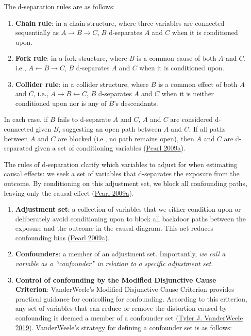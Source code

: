 \documentclass[
  singlecolumn]{article}
\begin{document}
The d-separation rules are as follows:

\begin{enumerate}
\def\labelenumi{\alph{enumi}.}
\item
  \textbf{Chain rule}: in a chain structure, where three variables are
  connected sequentially as \(A \rightarrow B \rightarrow C\), \(B\)
  d-separates \(A\) and \(C\) when it is conditioned upon.
\item
  \textbf{Fork rule}: in a fork structure, where \(B\) is a common cause
  of both \(A\) and \(C\), i.e., \(A \leftarrow B \rightarrow C\), \(B\)
  d-separates \(A\) and \(C\) when it is conditioned upon.
\item
  \textbf{Collider rule}: in a collider structure, where \(B\) is a
  common effect of both \(A\) and \(C\), i.e.,
  \(A \rightarrow B \leftarrow C\), \(B\) d-separates \(A\) and \(C\)
  when it is neither conditioned upon nor is any of \(B\)'s descendants.
\end{enumerate}

In each case, if \(B\) fails to d-separate \(A\) and \(C\), \(A\) and
\(C\) are considered d-connected given \(B\), suggesting an open path
between \(A\) and \(C\). If all paths between \(A\) and \(C\) are
blocked (i.e., no path remains open), then \(A\) and \(C\) are
d-separated given a set of conditioning variables
(\protect\hyperlink{ref-pearl2009}{Pearl 2009a}).

The rules of d-separation clarify which variables to adjust for when
estimating causal effects: we seek a set of variables that d-separates
the exposure from the outcome. By conditioning on this adjustment set,
we block all confounding paths, leaving only the causal effect
(\protect\hyperlink{ref-pearl2009}{Pearl 2009a}).

\begin{enumerate}
\def\labelenumi{\arabic{enumi}.}
\setcounter{enumi}{4}
\item
  \textbf{Adjustment set}: a collection of variables that we either
  condition upon or deliberately avoid conditioning upon to block all
  backdoor paths between the exposure and the outcome in the causal
  diagram. This act reduces confounding bias
  (\protect\hyperlink{ref-pearl2009}{Pearl 2009a}).
\item
  \textbf{Confounders}: a member of an adjustment set. Importantly,
  \emph{we call a variable as a ``confounder'' in relation to a specific
  adjustment set.}
\item
  \textbf{Control of confounding by the Modified Disjunctive Cause
  Criterion}: VanderWeele's Modified Disjunctive Cause Criterion
  provides practical guidance for controlling for confounding. According
  to this criterion, any set of variables that can reduce or remove the
  distortion caused by confounding is deemed a member of a confounder
  set (\protect\hyperlink{ref-vanderweele2019}{Tyler J. VanderWeele
  2019}). VanderWeele's strategy for defining a confounder set is as
  follows:
\end{enumerate}
\end{document}
